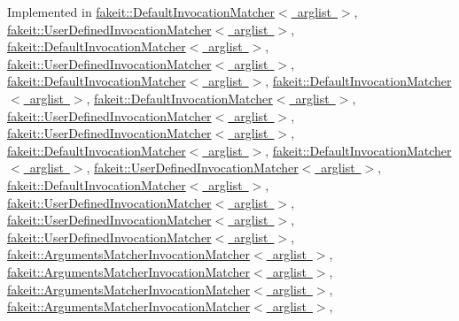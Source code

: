 Implemented in \mbox{\hyperlink{structfakeit_1_1DefaultInvocationMatcher_a056fc7516e51e5eb15831359cb376fef}{fakeit\+::\+Default\+Invocation\+Matcher$<$ arglist $>$}}, \mbox{\hyperlink{structfakeit_1_1UserDefinedInvocationMatcher_a8090f8ab0af9c775f833e725f4414368}{fakeit\+::\+User\+Defined\+Invocation\+Matcher$<$ arglist $>$}}, \mbox{\hyperlink{structfakeit_1_1DefaultInvocationMatcher_a056fc7516e51e5eb15831359cb376fef}{fakeit\+::\+Default\+Invocation\+Matcher$<$ arglist $>$}}, \mbox{\hyperlink{structfakeit_1_1UserDefinedInvocationMatcher_a8090f8ab0af9c775f833e725f4414368}{fakeit\+::\+User\+Defined\+Invocation\+Matcher$<$ arglist $>$}}, \mbox{\hyperlink{structfakeit_1_1DefaultInvocationMatcher_a056fc7516e51e5eb15831359cb376fef}{fakeit\+::\+Default\+Invocation\+Matcher$<$ arglist $>$}}, \mbox{\hyperlink{structfakeit_1_1DefaultInvocationMatcher_a056fc7516e51e5eb15831359cb376fef}{fakeit\+::\+Default\+Invocation\+Matcher$<$ arglist $>$}}, \mbox{\hyperlink{structfakeit_1_1DefaultInvocationMatcher_a056fc7516e51e5eb15831359cb376fef}{fakeit\+::\+Default\+Invocation\+Matcher$<$ arglist $>$}}, \mbox{\hyperlink{structfakeit_1_1UserDefinedInvocationMatcher_a8090f8ab0af9c775f833e725f4414368}{fakeit\+::\+User\+Defined\+Invocation\+Matcher$<$ arglist $>$}}, \mbox{\hyperlink{structfakeit_1_1UserDefinedInvocationMatcher_a8090f8ab0af9c775f833e725f4414368}{fakeit\+::\+User\+Defined\+Invocation\+Matcher$<$ arglist $>$}}, \mbox{\hyperlink{structfakeit_1_1DefaultInvocationMatcher_a056fc7516e51e5eb15831359cb376fef}{fakeit\+::\+Default\+Invocation\+Matcher$<$ arglist $>$}}, \mbox{\hyperlink{structfakeit_1_1DefaultInvocationMatcher_a056fc7516e51e5eb15831359cb376fef}{fakeit\+::\+Default\+Invocation\+Matcher$<$ arglist $>$}}, \mbox{\hyperlink{structfakeit_1_1UserDefinedInvocationMatcher_a8090f8ab0af9c775f833e725f4414368}{fakeit\+::\+User\+Defined\+Invocation\+Matcher$<$ arglist $>$}}, \mbox{\hyperlink{structfakeit_1_1DefaultInvocationMatcher_a056fc7516e51e5eb15831359cb376fef}{fakeit\+::\+Default\+Invocation\+Matcher$<$ arglist $>$}}, \mbox{\hyperlink{structfakeit_1_1UserDefinedInvocationMatcher_a8090f8ab0af9c775f833e725f4414368}{fakeit\+::\+User\+Defined\+Invocation\+Matcher$<$ arglist $>$}}, \mbox{\hyperlink{structfakeit_1_1UserDefinedInvocationMatcher_a8090f8ab0af9c775f833e725f4414368}{fakeit\+::\+User\+Defined\+Invocation\+Matcher$<$ arglist $>$}}, \mbox{\hyperlink{structfakeit_1_1UserDefinedInvocationMatcher_a8090f8ab0af9c775f833e725f4414368}{fakeit\+::\+User\+Defined\+Invocation\+Matcher$<$ arglist $>$}}, \mbox{\hyperlink{structfakeit_1_1ArgumentsMatcherInvocationMatcher_a5174a0a696bbbc3090b4b1d7937c02f9}{fakeit\+::\+Arguments\+Matcher\+Invocation\+Matcher$<$ arglist $>$}}, \mbox{\hyperlink{structfakeit_1_1ArgumentsMatcherInvocationMatcher_a5174a0a696bbbc3090b4b1d7937c02f9}{fakeit\+::\+Arguments\+Matcher\+Invocation\+Matcher$<$ arglist $>$}}, \mbox{\hyperlink{structfakeit_1_1ArgumentsMatcherInvocationMatcher_a5174a0a696bbbc3090b4b1d7937c02f9}{fakeit\+::\+Arguments\+Matcher\+Invocation\+Matcher$<$ arglist $>$}}, \mbox{\hyperlink{structfakeit_1_1ArgumentsMatcherInvocationMatcher_a5174a0a696bbbc3090b4b1d7937c02f9}{fakeit\+::\+Arguments\+Matcher\+Invocation\+Matcher$<$ arglist $>$}}, 
